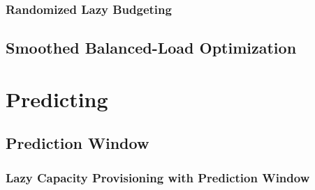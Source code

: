 \subsubsection{Randomized Lazy Budgeting}

\subsection{Smoothed Balanced-Load Optimization}

\section{Predicting}

\subsection{Prediction Window}

\subsubsection{Lazy Capacity Provisioning with Prediction Window}
